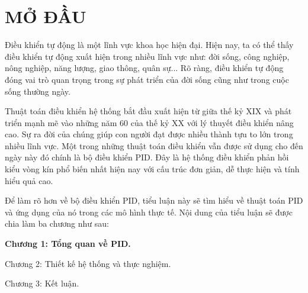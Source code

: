 
\chapter*{MỞ ĐẦU} %

\label{Chapter0} %


Điều khiển tự động là một lĩnh vực khoa học hiện đại. Hiện nay, ta có thể thấy điều khiển tự động xuất hiện trong nhiều lĩnh vực như: đời sống, công nghiệp, nông nghiệp, năng lượng, giao thông, quân sự... Rõ ràng, điều khiển tự động đóng vai trò quan trọng trong sự phát triển của đời sống cũng như trong cuộc sống thường ngày.

Thuật toán điều khiển hệ thống bắt đầu xuất hiện từ giữa thế kỷ XIX và phát triển mạnh mẽ vào những năm 60 của thế kỷ XX với lý thuyết điều khiển nâng cao. Sự ra đời của chúng giúp con người đạt được nhiều thành tựu to lớn trong nhiều lĩnh vực. Một trong những thuật toán điều khiển vẫn được sử dụng cho đến ngày này đó chính là bộ điều khiển PID. Đây là hệ thống điều khiển phản hồi kiểu vòng kín phổ biến nhất hiện nay với cấu trúc đơn giản, dễ thực hiện và tính hiểu quả cao.

Để làm rõ hơn về bộ điều khiển PID, tiểu luận này sẽ tìm hiểu về thuật toán PID và ứng dụng của nó trong các mô hình thực tế. Nội dung của tiểu luận sẽ được chia làm ba chương như sau: 

\bfseries 
Chương 1: Tổng quan về PID.

Chương 2: Thiết kế hệ thống và thực nghiệm.

Chương 3: Kết luận.
\mdseries